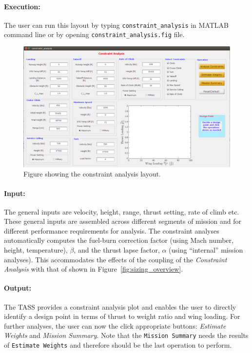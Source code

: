 \documentclass[pdftex,11pt,letter]{article}
\begin{document}
\paragraph{Execution:}
The user can run this layout by typing \texttt{constraint\_analysis} in MATLAB command line or by opening \texttt{constraint\_analysis.fig} file.
\begin{figure}[h!]
	\centering
	\includegraphics[scale=0.45]{figures/constraints_layout.pdf}
	\caption{Figure showing the constraint analysis layout.}
	\label{constraints_layout}
\end{figure}

\paragraph{Input:} The general inputs are velocity, height, range, thrust setting, rate of climb etc. These general inputs are assembled across different segments of mission and for different performance requirements for analysis. The constraint analyses automatically computes the fuel-burn correction factor (using Mach number, height, temperature), $\beta$, and the thrust lapse factor, $\alpha$ (using ``internal'' mission analyses). This accommodates the effects of the coupling of the \textit{Constraint Analysis} with that of  shown in Figure~\ref{fig:sizing_overview}.

\paragraph{Output:} 
 The  TASS provides a constraint analysis plot and enables the user to directly identify a design point in terms of thrust to weight ratio and wing loading. For further analyses, the user can now the click appropriate buttons: \textit{Estimate Weights} and \textit{Mission Summary}. Note that the \texttt{Mission Summary} needs the results of  \texttt{Estimate Weights} and therefore should be the last operation to perform.
\end{document}

